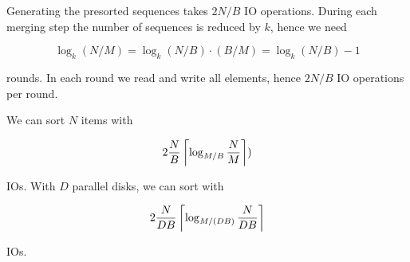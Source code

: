 Generating the presorted sequences takes $2N/B$ IO operations. During each merging step the number of sequences is reduced by $k$, hence we need

\[\log_k(N/M) = \log_k(N/B)\cdot (B/M) = \log_k(N/B) - 1\]

rounds. In each round we read and write all elements, hence $2N/B$ IO operations per round.

\begin{thm} We can sort $N$ items with 

\[2\frac NB \left\lceil \log_{M/B} \frac NM \right\rceil)\]

IOs. With $D$ parallel disks, we can sort with

\[2\frac{N}{DB}\left\lceil \log_{M/(DB)} \frac{N}{DB} \right\rceil\]

IOs.
\end{thm}